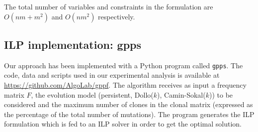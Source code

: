 \documentclass[a4paper,USenglish]{article}
\theoremstyle{definition}
\begin{document}





The total number of variables and constraints in the formulation are
$O(nm+m^2)$ and $O(nm^2)$ respectively.

\subsection{ILP implementation: gpps}

Our approach has been implemented with a Python program called
\texttt{gpps}.  The code, data and scripts used in our experimental
analysis is available at \url{https://github.com/AlgoLab/gppf}.  The
algorithm receives as input a frequency matrix $F$, the evolution
model (persistent, Dollo($k$), Camin-Sokal($k$)) to be considered and
the maximum number of clones in the clonal matrix (expressed as the
percentage of the total number of mutations).  The program generates
the ILP formulation which is fed to an ILP solver in order to get the
optimal solution.
\end{document}
